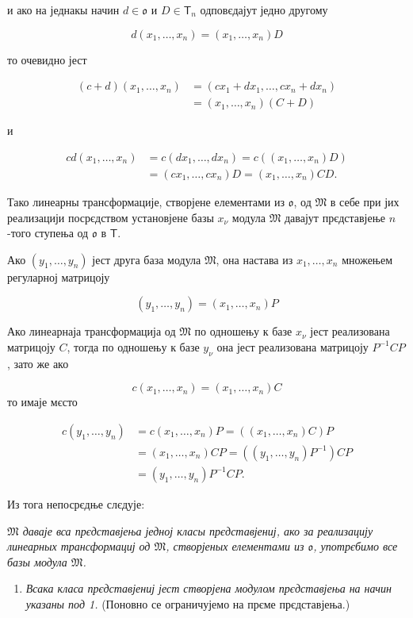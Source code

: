 \documentclass[11pt]{article}
\providecommand{\tightlist}{\setlength{\itemsep}{0pt}\setlength{\parskip}{0pt}}
\begin{document}
и ако на једнакы начин \(d\in\mathfrak{o}\) и \(D\in\mathsf T_n\) одповєдајут једно другому

\[
d(x_1,\ldots,x_n)=(x_1,\ldots,x_n)D
\]

то очевидно јест

\[
\begin{aligned}
(c+d)(x_1,\ldots,x_n)
&=(cx_1+dx_1,\ldots,cx_n+dx_n)\\
&=(x_1,\ldots,x_n)(C+D)
\end{aligned}
\]

и

\[
\begin{aligned}
cd(x_1,\ldots,x_n)
&=c(dx_1,\ldots,dx_n)=c((x_1,\ldots,x_n)D)\\
&=(cx_1,\ldots,cx_n)D=(x_1,\ldots,x_n)CD.
\end{aligned}
\]

Тако линеарны трансформације, створјене елементами из \(\mathfrak{o}\), од \(\mathfrak M\) в себе при јих реализацији посрєдством установјене базы \(x_\nu\) модула \(\mathfrak M\) давајут прєдставјење \(n\)-того ступења од \(\mathfrak{o}\) в \(\mathsf T\).

Ако \((y_1,\ldots,y_n)\) јест друга база модула \(\mathfrak M\), она настава из \(x_1,\ldots,x_n\) множењем регуларној матрицоју

\[(y_1,\ldots,y_n)=(x_1,\ldots,x_n)P\]

Ако линеарнаја трансформација од \(\mathfrak M\) по одношењу к базе \(x_\nu\) јест реализована матрицоју \(C\), тогда по одношењу к базе \(y_\nu\) она јест реализована матрицоју \(P^{-1}CP\), зато же ако

\[c(x_1,\ldots,x_n)=(x_1,\ldots,x_n)C\]
то имаје мєсто

\[
\begin{aligned}
c(y_1,\ldots,y_n)
&=c(x_1,\ldots,x_n)P=((x_1,\ldots,x_n)C)P\\
&=(x_1,\ldots,x_n)CP=((y_1,\ldots,y_n)P^{-1})CP\\
&=(y_1,\ldots,y_n)P^{-1}CP.
\end{aligned}
\]

Из тога непосрєдње слєдује:

\emph{\(\mathfrak M\) даваје вса прєдставјења једној класы прєдставјениј, ако за реализацију линеарных трансформациј од \(\mathfrak M\), створјеных елементами из \(\mathfrak{o}\), употрєбимо все базы модула \(\mathfrak M\).}

\begin{enumerate}
\def\labelenumi{\arabic{enumi}.}
\setcounter{enumi}{1}
\tightlist
\item
  \emph{Всака класа прєдставјениј јест створјена модулом прєдставјења на начин указаны под 1.} (Поновно се ограничујемо на прєме прєдставјења.)
\end{enumerate}
\end{document}
